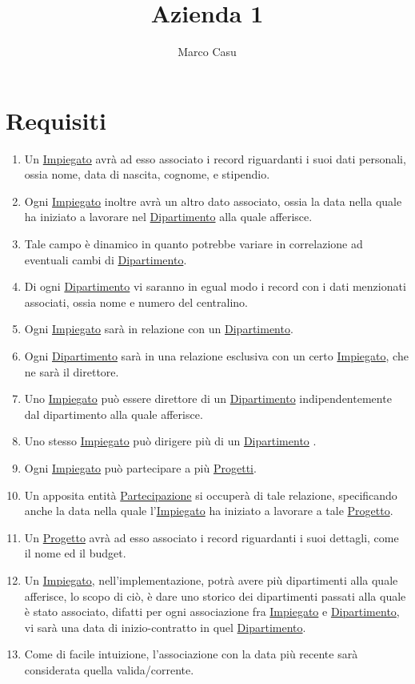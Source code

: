 \documentclass[12pt, letterpaper]{article}
\title{Azienda 1}
\author{Marco Casu}
\date{\vspace{-5ex}}
\begin{document}
\maketitle
\begin{figure}[h]
    \centering{
    
    }
\end{figure}
\section{Requisiti}
\begin{enumerate}
    \item Un \underline{Impiegato} avrà ad esso associato i record riguardanti i suoi 
    dati personali, ossia nome, data di nascita, cognome, e stipendio.
    \item Ogni \underline{Impiegato} inoltre avrà un altro dato associato, ossia la data nella 
    quale ha iniziato a lavorare nel \underline{Dipartimento} alla quale afferisce.
    \item Tale campo è dinamico in quanto potrebbe variare in correlazione ad eventuali 
    cambi di \underline{Dipartimento}.
    \item Di ogni \underline{Dipartimento} vi saranno in egual modo i record con i dati menzionati 
    associati, ossia nome e numero del centralino.
    \item Ogni \underline{Impiegato} sarà in relazione con un \underline{Dipartimento}.
    \item Ogni \underline{Dipartimento} sarà in una relazione esclusiva con un certo 
    \underline{Impiegato}, che ne sarà il direttore. 
    \item Uno \underline{Impiegato} può essere direttore di un \underline{Dipartimento} 
    indipendentemente dal dipartimento alla quale afferisce.
    \item Uno stesso \underline{Impiegato} può dirigere più di un \underline{Dipartimento} .
    \item Ogni \underline{Impiegato} può partecipare a più \underline{Progetti}. 
    \item Un apposita entità \underline{Partecipazione} si occuperà di tale relazione, specificando 
    anche la data nella quale l'\underline{Impiegato} ha iniziato a lavorare a tale 
    \underline{Progetto}.
    \item Un \underline{Progetto} avrà ad esso associato i record riguardanti i suoi 
    dettagli, come il nome ed il budget.
    \item Un  \underline{Impiegato}, nell'implementazione, potrà avere più dipartimenti alla quale 
    afferisce, lo scopo di ciò, è dare uno storico dei dipartimenti 
    passati alla quale è stato associato, difatti per ogni associazione fra  \underline{Impiegato} e \underline{Dipartimento},
    vi sarà una data di inizio-contratto in quel \underline{Dipartimento}.
    \item Come di facile intuizione, l'associazione con la data più recente sarà considerata 
    quella valida/corrente.
\end{enumerate}
\newpage
\end{document}
